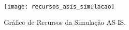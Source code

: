 \begin{figure}[H]
	\centering
	\texttt{[image: recursos\_asis\_simulacao]}
	\caption[Gráfico de Recursos da Simulação AS-IS]{Gráfico de Recursos da Simulação AS-IS.}
	\label{fig:recursosasis}
\end{figure}